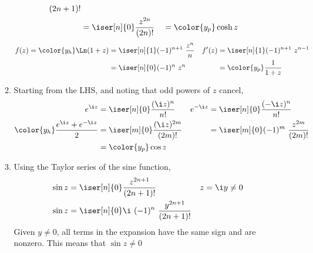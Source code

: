 \begin{enumerate}
\begin{enumerate}
\begin{align}
                        {(2n+1)!}                                             \\
                                 & = \iser[n]{0} \frac{z^{2n}}{(2n)!}       &
                                 & = \color{y_p} \cosh z
                    \end{align}
                    \begin{align}
                        f(z) = {\color{y_h}
                        \Ln(1 + z)} & = \iser[n]{1} (-1)^{n+1}\ \frac{z^n}{n} &
                        f'(z)       & = \iser[n]{1} (-1)^{n+1}\ z^{n-1}         \\
                                    & = \iser[n]{0} (-1)^n\ z^n               &
                                    & = \color{y_p} \frac{1}{1 + z}
                    \end{align}

              \item Starting from the LHS, and noting that odd powers of $ z $ cancel,
                    \begin{align}
                        e^{\i z}  & = \iser[n]{0} \frac{(\i z)^n}{n!}          &
                        e^{-\i z} & = \iser[n]{0} \frac{(-\i z)^n}{n!}           \\
                        \color{y_h} \frac{e^{\i z} + e^{-\i z}}
                        {2}       & = \iser[m]{0} \frac{(\i z)^{2m}}{(2m)!}    &
                                  & = \iser[m]{0} (-1)^m\ \frac{z^{2m}}{(2m)!}   \\
                                  & = \color{y_p} \cos z
                    \end{align}

              \item Using the Taylor series of the sine function,
                    \begin{align}
                        \sin z & = \iser[n]{0} \frac{z^{2n+1}}{(2n+1)!}             &
                        z      & = \i y \neq 0                                        \\
                        \sin z & = \iser[n]{0} \i\ (-1)^n\ \frac{y^{2n+1}}{(2n+1)!}
                    \end{align}
                    Given $ y \neq 0 $, all terms in the expansion have the same sign and
                    are nonzero. This means that $ \sin z \neq 0 $
          \end{enumerate}


\end{enumerate}
